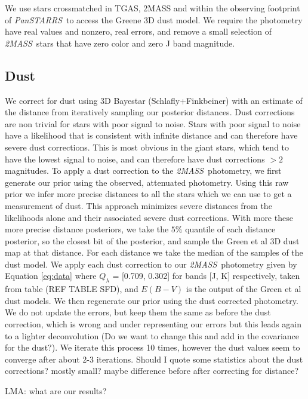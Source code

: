 \documentclass[modern]{aastex61}
\newcommand{\acronym}[1]{{\small{#1}}}
\newcommand{\project}[1]{\textsl{#1}}
\newcommand{\tmass}{\project{\acronym{2MASS}}}
\newcommand{\panstarrs}{\project{Pan\acronym{STARRS}}}
\begin{document}
We use stars crossmatched in TGAS, 2MASS and within the observing footprint of \panstarrs\ to access the Greene 3D dust model. We require the photometry have real values and nonzero, real errors, and remove a small selection of \tmass\ stars that have zero color and zero J band magnitude.

\subsection{Dust}

We correct for dust using 3D Bayestar (Schlafly+Finkbeiner) with an estimate of the distance from iteratively sampling our posterior distances. Dust corrections are non trivial for stars with poor signal to noise. Stars with poor signal to noise have a likelihood that is consistent with infinite distance and can therefore have severe dust corrections. This is most obvious in the giant stars, which tend to have the lowest signal to noise, and can therefore have dust corrections $> 2$ magnitudes. To apply a dust correction to the \tmass\ photometry, we first generate our prior using the observed, attenuated photometry. Using this raw prior we infer more precise distances to all the stars which we can use to get a measurement of dust. This approach minimizes severe distances from the likelihoods alone and their associated severe dust corrections. With more these more precise distance posteriors, we take the $5\%$ quantile of each distance posterior, so the closest bit of the posterior, and sample the Green et al 3D dust map at that distance. For each distance we take the median of the samples of the dust model. We apply each dust correction to our \tmass\ photometry given by Equation \ref{eq:data} where $Q_{\lambda}$ = [0.709, 0.302] for bands [J, K] respectively, taken from table (REF TABLE SFD), and $E(B-V)$ is the output of the Green et al dust models. We then regenerate our prior using the dust corrected photometry. We do not update the errors, but keep them the same as before the dust correction, which is wrong and under representing our errors but this leads again to a lighter deconvolution (Do we want to change this and add in the covariance for the dust?). We iterate this process 10 times, however the dust values seem to converge after about 2-3 iterations. Should I quote some statistics about the dust corrections? mostly small? maybe difference before after correcting for distance?

LMA: what are our results?
\end{document}
